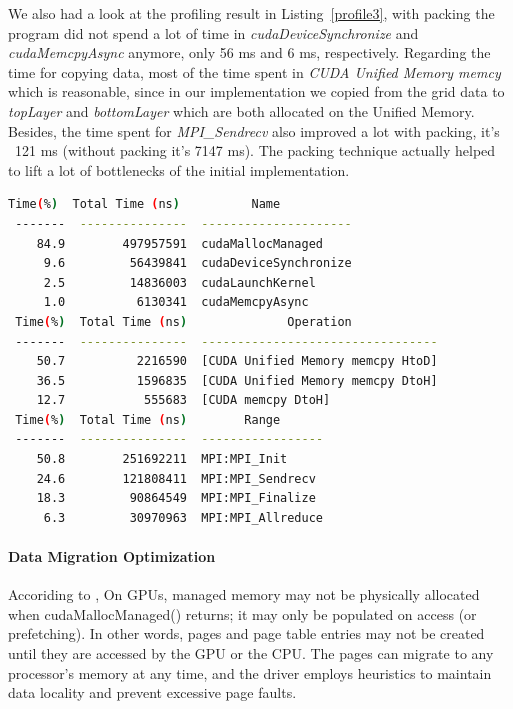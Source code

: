\documentclass[article]{scrartcl}
\begin{document}
We also had a look at the profiling result in Listing~\ref{profile3}, with packing the program did not spend a lot of time in \textit{cudaDeviceSynchronize} and \textit{cudaMemcpyAsync} anymore, only 56 ms and 6 ms, respectively. Regarding the time for copying data, most of the time spent in \textit{CUDA Unified Memory memcy} which is reasonable, since in our implementation we copied from the grid data to \textit{topLayer} and \textit{bottomLayer} which are both allocated on the Unified Memory. Besides, the time spent for \textit{MPI\_Sendrecv} also improved a lot with packing, it's ~121 ms (without packing it's 7147 ms). The packing technique actually helped to lift a lot of bottlenecks of the initial implementation.
\pagebreak
\begin{lstlisting}[frame=single,language=bash,caption={Profiling of cuda-aware with Packing, gridsize 512 x 512, 4 MPI processes},label={profile3}, captionpos=b]
 Time(%)  Total Time (ns)          Name
 -------  ---------------  ---------------------
    84.9        497957591  cudaMallocManaged
     9.6         56439841  cudaDeviceSynchronize
     2.5         14836003  cudaLaunchKernel
     1.0          6130341  cudaMemcpyAsync
 Time(%)  Total Time (ns)              Operation
 -------  ---------------  ---------------------------------
    50.7          2216590  [CUDA Unified Memory memcpy HtoD]
    36.5          1596835  [CUDA Unified Memory memcpy DtoH]
    12.7           555683  [CUDA memcpy DtoH]
 Time(%)  Total Time (ns)        Range
 -------  ---------------  -----------------
    50.8        251692211  MPI:MPI_Init
    24.6        121808411  MPI:MPI_Sendrecv
    18.3         90864549  MPI:MPI_Finalize
     6.3         30970963  MPI:MPI_Allreduce
\end{lstlisting}

\paragraph{Data Migration Optimization}
Accoriding to \cite{unifiedMemory}, On GPUs, managed memory may not be physically allocated when cudaMallocManaged() returns; 
it may only be populated on access (or prefetching). In other words, pages and page table entries may not be created until they are accessed by the GPU or the CPU. 
The pages can migrate to any processor's memory at any time, and the driver employs heuristics to maintain data locality and prevent excessive page faults.
\end{document}
